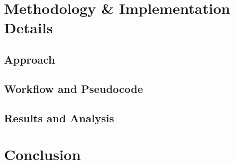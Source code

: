 \documentclass[a4paper]{LaTeX/acmsiggraph}
\begin{document}
\section{Methodology \& Implementation Details}
\subsection{Approach}
\lipsum[2]

\subsection{Workflow and Pseudocode}
\lipsum[3]

\subsection{Results and Analysis}
\lipsum[4]

\section{Conclusion}
\lipsum[1]



\end{document}

